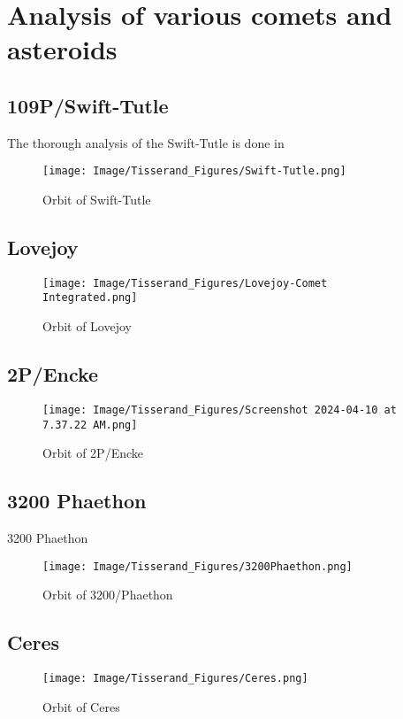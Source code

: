 \documentclass{article}
\begin{document}
\section{Analysis of various comets and asteroids}

\subsection{109P/Swift-Tutle}
The thorough analysis of the Swift-Tutle is done in \cite{article} 
\begin{figure}[htbp]
    \centering
    \texttt{[image: Image/Tisserand\_Figures/Swift-Tutle.png]}
    \caption{Orbit of Swift-Tutle}
    \label{fig:enter-label}
\end{figure}
\newpage
\subsection{Lovejoy}
\begin{figure}[htbp]
    \centering
    \texttt{[image: Image/Tisserand\_Figures/Lovejoy-Comet Integrated.png]}
    \caption{Orbit of Lovejoy}
    \label{fig:enter-label}
\end{figure}
\subsection{2P/Encke}
\begin{figure}[htbp]
    \centering
    \texttt{[image: Image/Tisserand\_Figures/Screenshot 2024-04-10 at 7.37.22 AM.png]}
    \caption{Orbit of 2P/Encke}
    \label{fig:enter-label}
\end{figure}
\newpage
\subsection{3200 Phaethon}
3200 Phaethon
\begin{figure}[htbp]
    \centering
    \texttt{[image: Image/Tisserand\_Figures/3200Phaethon.png]}
    \caption{Orbit of 3200/Phaethon}
    \label{fig:enter-label}
\end{figure}
\subsection{Ceres}
\begin{figure}[htbp]
    \centering
    \texttt{[image: Image/Tisserand\_Figures/Ceres.png]}
    \caption{Orbit of Ceres}
    \label{fig:enter-label}
\end{figure}
\newpage
\end{document}
